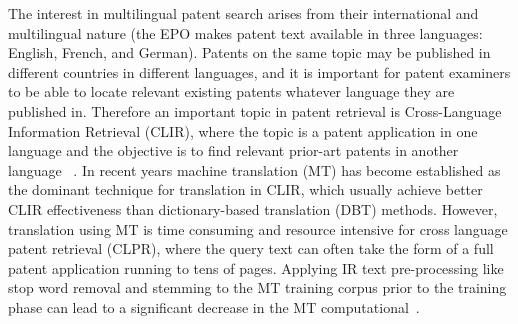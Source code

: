 The interest in multilingual patent search arises from their international and multilingual nature (the EPO makes patent text available in three languages: English, French, and German). Patents on the same topic may be published in different countries in different languages, and it is important for patent examiners to be able to locate relevant existing patents whatever language they are published in. Therefore an important topic in patent retrieval is Cross-Language Information Retrieval (CLIR), where the topic is a patent application in one language and the objective is to find relevant prior-art patents in another language ~\citep{roda2010clef, joho2010survey,  DBLP:conf/clef/PiroiLHSMF12, lupu2013patent}. In recent years machine
translation (MT) has become established as the dominant technique for translation in CLIR, which usually achieve better CLIR effectiveness than dictionary-based translation (DBT) methods. However, translation using MT is time consuming and resource intensive for cross language patent retrieval (CLPR), where the query text can often take the form of a full patent application running to tens of pages. Applying IR text pre-processing like stop word removal and stemming to the MT training corpus prior to the training phase can lead to a significant decrease in the MT computational~\citep{magdy2013studying}.


